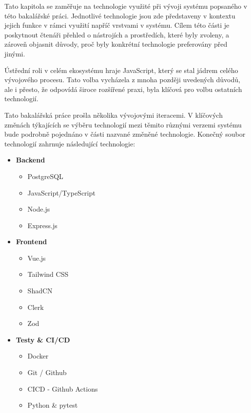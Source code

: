 Tato kapitola se zaměřuje na technologie využité při vývoji systému popsaného v této bakalářské práci. Jednotlivé technologie jsou zde představeny v kontextu jejich funkce v rámci využití napříč vrstvami v systému. Cílem této části je poskytnout čtenáři přehled o nástrojích a prostředích, které byly zvoleny, a zároveň objasnit důvody, proč byly konkrétní technologie preferovány před jinými.

Ústřední roli v celém ekosystému hraje JavaScript, který se stal jádrem celého vývojového procesu. Tato volba vycházela z mnoha později uvedených důvodů, ale i přesto, že odpovídá široce rozšířené praxi, byla klíčová pro volbu ostatních technologií.

Tato bakalářská práce prošla několika vývojovými iteracemi. V klíčových změnách týkajících se výběru technologií mezi těmito různými verzemi systému bude podrobně pojednáno v části nazvané změněné technologie. Konečný soubor technologií zahrnuje následující technologie: 
\begin{itemize}
    \item \textbf{Backend}
        \begin{itemize}
            \item PostgreSQL
            \item JavaScript/TypeScript
            \item Node.js
            \item Express.js
        \end{itemize}
    \item \textbf{Frontend}
        \begin{itemize}
            \item Vue.js
            \item Tailwind CSS
            \item ShadCN
            \item Clerk
            \item Zod
        \end{itemize}
    \item \textbf{Testy \& CI/CD}
        \begin{itemize}
            \item Docker
            \item Git / Github
            \item CICD - Github Actions
            \item Python \& pytest
        \end{itemize}    
\end{itemize}

